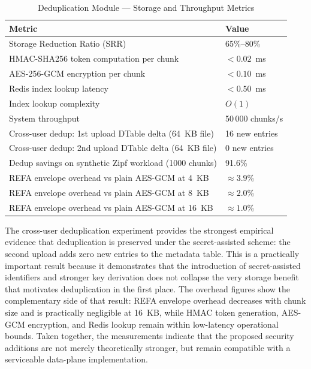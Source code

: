 \documentclass[12pt,a4paper,oneside]{report}
\begin{document}
\begin{table}[H]
\centering
\caption{Deduplication Module — Storage and Throughput Metrics}
\label{tab:dedup}
\begin{tabularx}{\textwidth}{L{9.5cm}C{3.5cm}}
\toprule
\textbf{Metric} & \textbf{Value} \\
\midrule
Storage Reduction Ratio (SRR)                                & 65\%–80\% \\
HMAC-SHA256 token computation per chunk                      & $<0.02$~ms \\
AES-256-GCM encryption per chunk                             & $<0.10$~ms \\
Redis index lookup latency                                   & $<0.50$~ms \\
Index lookup complexity                                      & $O(1)$ \\
System throughput                                            & 50\,000 chunks/s \\
Cross-user dedup: 1st upload DTable delta (64~KB file)       & 16 new entries \\
Cross-user dedup: 2nd upload DTable delta (64~KB file)       & 0 new entries \\
Dedup savings on synthetic Zipf workload (1000 chunks)       & 91.6\% \\
REFA envelope overhead vs plain AES-GCM at 4~KB             & $\approx 3.9\%$ \\
REFA envelope overhead vs plain AES-GCM at 8~KB             & $\approx 2.0\%$ \\
REFA envelope overhead vs plain AES-GCM at 16~KB            & $\approx 1.0\%$ \\
\bottomrule
\end{tabularx}
\end{table}

The cross-user deduplication experiment provides the strongest empirical evidence that deduplication is preserved under the secret-assisted scheme: the second upload adds zero new entries to the metadata table.
This is a practically important result because it demonstrates that the introduction of secret-assisted identifiers and stronger key derivation does not collapse the very storage benefit that motivates deduplication in the first place.
The overhead figures show the complementary side of that result: REFA envelope overhead decreases with chunk size and is practically negligible at 16~KB, while HMAC token generation, AES-GCM encryption, and Redis lookup remain within low-latency operational bounds.
Taken together, the measurements indicate that the proposed security additions are not merely theoretically stronger, but remain compatible with a serviceable data-plane implementation.
\end{document}
